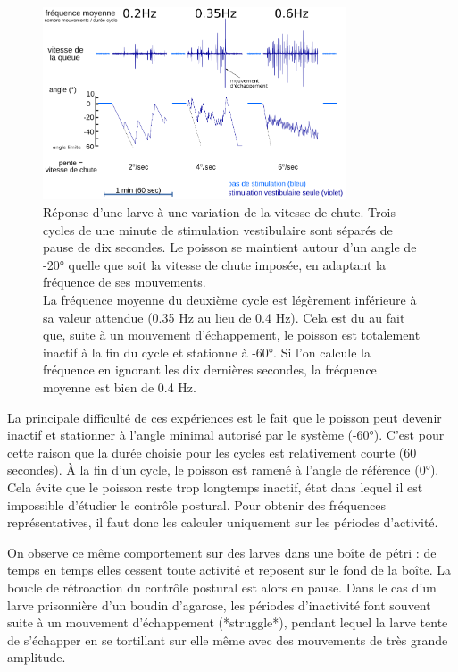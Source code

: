 \begin{figure}
\centering
\includegraphics[width=0.8\textwidth]{./files/variation-vitesse.svg.png}
\caption{
Réponse d'une larve à une variation de la vitesse de chute. Trois cycles de une minute de stimulation vestibulaire sont séparés de pause de dix secondes. Le poisson se maintient autour d'un angle de -20° quelle que soit la vitesse de chute imposée, en adaptant la fréquence de ses mouvements.
\\
La fréquence moyenne du deuxième cycle est légèrement inférieure à sa valeur attendue (0.35 Hz au lieu de 0.4 Hz). Cela est du au fait que, suite à un mouvement d'échappement, le poisson est totalement inactif à la fin du cycle et stationne à -60°. Si l'on calcule la fréquence en ignorant les dix dernières secondes, la fréquence moyenne est bien de 0.4 Hz.
}
\end{figure}


La principale difficulté de ces expériences est le fait que le poisson peut devenir inactif et stationner à l'angle minimal autorisé par le système (-60°). C'est pour cette raison que la durée choisie pour les cycles est relativement courte (60 secondes). À la fin d'un cycle, le poisson est ramené à l'angle de référence (0°). Cela évite que le poisson reste trop longtemps inactif, état dans lequel il est impossible d'étudier le contrôle postural. Pour obtenir des fréquences représentatives, il faut donc les calculer uniquement sur les périodes d'activité.

On observe ce même comportement sur des larves dans une boîte de pétri : de temps en temps elles cessent toute activité et reposent sur le fond de la boîte. La boucle de rétroaction du contrôle postural est alors en pause. Dans le cas d'un larve prisonnière d'un boudin d'agarose, les périodes d'inactivité font souvent suite à un mouvement d'échappement (*struggle*), pendant lequel la larve tente de s'échapper en se tortillant sur elle même avec des mouvements de très grande amplitude.

